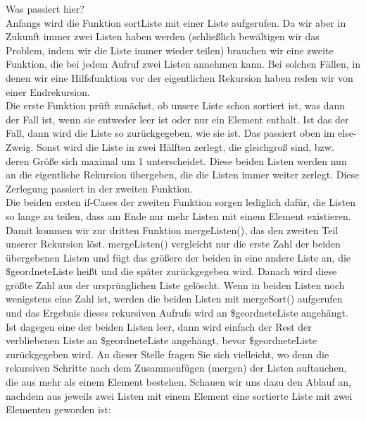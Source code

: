 Was passiert hier?\\

Anfangs wird die Funktion sortListe mit einer Liste aufgerufen. Da wir aber in Zukunft immer zwei Listen haben werden (schließlich bewältigen wir das Problem, indem wir die Liste immer wieder teilen) brauchen wir eine zweite Funktion, die bei jedem Aufruf zwei Listen annehmen kann. Bei solchen Fällen, in denen wir eine Hilfsfunktion vor der eigentlichen Rekursion haben reden wir von einer Endrekursion.\\

Die erste Funktion prüft zunächst, ob unsere Liste schon sortiert ist, was dann der Fall ist, wenn sie entweder leer ist oder nur ein Element enthalt. Ist das der Fall, dann wird die Liste so zurückgegeben, wie sie ist. Das passiert oben im else-Zweig. Sonst wird die Liste in zwei Hälften zerlegt, die gleichgroß sind, bzw. deren Größe sich maximal um 1 unterscheidet. Diese beiden Listen werden nun an die eigentliche Rekursion übergeben, die die Listen immer weiter zerlegt. Diese Zerlegung passiert in der zweiten Funktion.\\

Die beiden ersten if-Cases der zweiten Funktion sorgen lediglich dafür, die Listen so lange zu teilen, dass am Ende nur mehr Listen mit einem Element existieren.\\

Damit kommen wir zur dritten Funktion mergeListen(), das den zweiten Teil unserer Rekursion löst. mergeListen() vergleicht nur die erste Zahl der beiden übergebenen Listen und fügt das größere der beiden in eine andere Liste an, die \$geordneteListe heißt und die später zurückgegeben wird. Danach wird diese größte Zahl aus der ursprünglichen Liste gelöscht. Wenn in beiden Listen noch wenigstens eine Zahl ist, werden die beiden Listen mit mergeSort() aufgerufen und das Ergebnis dieses rekursiven Aufrufs wird an \$geordneteListe angehängt.\\

Ist dagegen eine der beiden Listen leer, dann wird einfach der Rest der verbliebenen Liste an \$geordneteListe angehängt, bevor \$geordneteListe zurückgegeben wird.
An dieser Stelle fragen Sie sich vielleicht, wo denn die rekursiven Schritte nach dem Zusammenfügen (mergen) der Listen auftauchen, die aus mehr als einem Element bestehen. Schauen wir uns dazu den Ablauf an, nachdem aus jeweils zwei Listen mit einem Element eine sortierte Liste mit zwei Elementen geworden ist:\\

